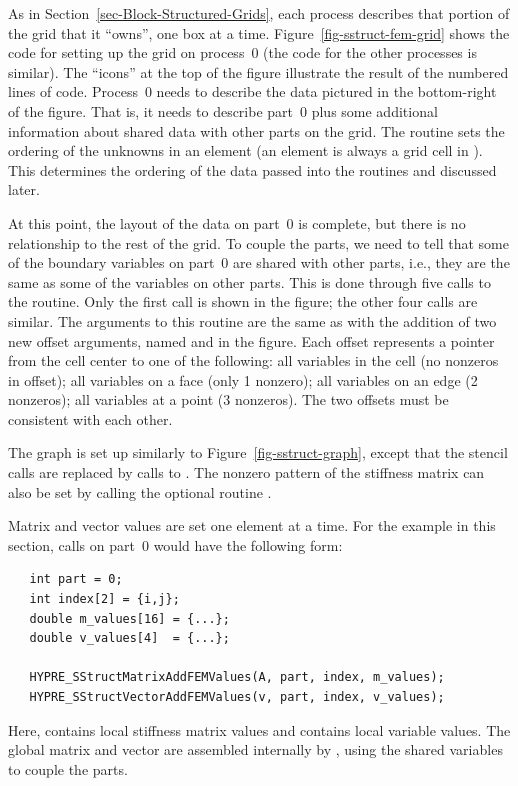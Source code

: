 As in Section~\ref{sec-Block-Structured-Grids}, each process describes that
portion of the grid that it ``owns'', one box at a time.
Figure~\ref{fig-sstruct-fem-grid} shows the code for setting up the grid on
process~0 (the code for the other processes is similar).  The ``icons'' at the
top of the figure illustrate the result of the numbered lines of code.
Process~0 needs to describe the data pictured in the bottom-right of the figure.
That is, it needs to describe part~0 plus some additional information about
shared data with other parts on the grid.  The  routine
sets the ordering of the unknowns in an element (an element is always a grid
cell in \hypre{}).  This determines the ordering of the data passed into the
routines  and  discussed
later.

At this point, the layout of the data on part~0 is complete, but there is no
relationship to the rest of the grid.  To couple the parts, we need to tell
\hypre{} that some of the boundary variables on part~0 are shared with other
parts, i.e., they are the same as some of the variables on other parts.  This is
done through five calls to the  routine.  Only the first
call is shown in the figure; the other four calls are similar.  The arguments to
this routine are the same as  with the addition of two
new offset arguments, named  and  in the figure.
Each offset represents a pointer from the cell center to one of the following:
all variables in the cell (no nonzeros in offset); all variables on a face (only
1 nonzero); all variables on an edge (2 nonzeros); all variables at a point (3
nonzeros).  The two offsets must be consistent with each other.

The graph is set up similarly to Figure~\ref{fig-sstruct-graph}, except that the
stencil calls are replaced by calls to .  The nonzero
pattern of the stiffness matrix can also be set by calling the optional routine
.

Matrix and vector values are set one element at a time.  For the example in this
section, calls on part~0 would have the following form:
\begin{verbatim}
   int part = 0;
   int index[2] = {i,j};
   double m_values[16] = {...};
   double v_values[4]  = {...};
   
   HYPRE_SStructMatrixAddFEMValues(A, part, index, m_values);
   HYPRE_SStructVectorAddFEMValues(v, part, index, v_values);
\end{verbatim}
Here,  contains local stiffness matrix values and 
contains local variable values.  The global matrix and vector are assembled
internally by \hypre{}, using the shared variables to couple the parts.

